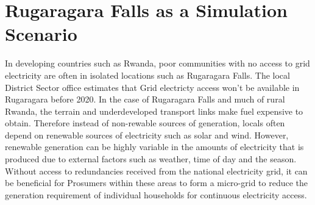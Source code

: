 \section*{Rugaragara Falls as a Simulation Scenario}
In developing countries such as Rwanda, poor communities with no access to grid electricity are often in isolated locations such as Rugaragara Falls. The local District Sector office estimates that Grid electricty access won't be available in Rugaragara before 2020. In the case of Rugaragara Falls and much of rural Rwanda, the terrain and underdeveloped transport links make fuel expensive to obtain. Therefore instead of non-rewable sources of generation, locals often depend on renewable sources of electricity such as solar and wind. However, renewable generation can be highly variable in the amounts of electricity that is produced due to external factors such as weather, time of day and the season. Without access to redundancies received from the national electricity grid, it can be beneficial for Prosumers within these areas to form a micro-grid to reduce the generation requirement of individual households for continuous electricity access.




